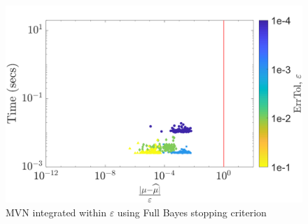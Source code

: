 \documentclass[twocolumn]{svjour3}          %
\begin{document}
\begin{figure}
	\centering
	\includegraphics[width=0.95\linewidth]{"figures/MVN_guaranteed_time_FB_C0_29-Jul-2018 03-10-36"}
	\caption[MVN guaranteed : Number of sample]{MVN integrated within $\varepsilon$ using Full Bayes stopping criterion}
	\label{fig:mvn-guaranteed-FB}
\end{figure}
\end{document}
